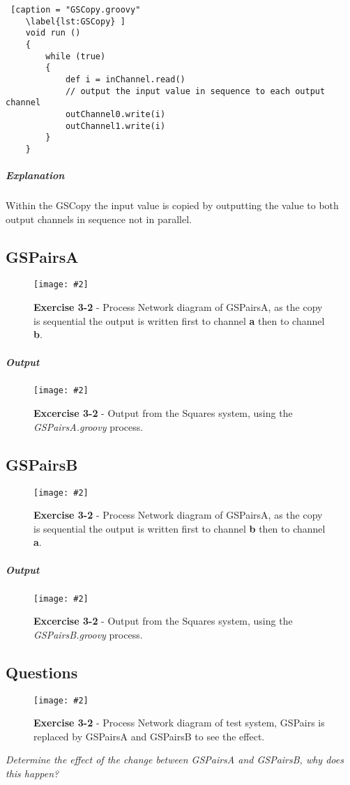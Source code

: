 \documentclass[10pt, a4paper]{article}
\newcommand{\figuremacro}[5]{
    \begin{figure}[#1]
        \centering
        \texttt{[image: \#2]}
        \caption[#3]{\textbf{#3}#4}
        \label{fig:#2}
    \end{figure}
}
\begin{document}
	\begin{lstlisting} [caption = "GSCopy.groovy"
	\label{lst:GSCopy} ]
	void run ()
	{
		while (true)
		{
			def i = inChannel.read()
			// output the input value in sequence to each output channel
			outChannel0.write(i)
			outChannel1.write(i)
		}
	} \end{lstlisting}
	
	\subparagraph{Explanation}
	
	Within the GSCopy the input value is copied by outputting the value to both output channels in sequence not in parallel.
	
	\subsection*{GSPairsA}

	\figuremacro{H}{GPairsAPN}{Exercise 3-2}{ - Process Network diagram of GSPairsA, as the copy is sequential the output is written first to channel \textbf{a} then to channel \textbf{b}.}{1.0}

	\subparagraph{Output} \hfill
	
	\figuremacro{H}{pairsAoutput}{Excercise 3-2}{ -  Output from the Squares system, using the \textit{GSPairsA.groovy} process.}{0.4}
	
	\subsection*{GSPairsB}
	
	\figuremacro{H}{GPairsBPN}{Exercise 3-2}{ - Process Network diagram of GSPairsA, as the copy is sequential the output is written first to channel \textbf{b} then to channel \textbf{a}.}{1.0}

	\subparagraph{Output} \hfill
		
	\figuremacro{H}{pairsBoutput}{Excercise 3-2}{ -  Output from the Squares system, using the \textit{GSPairsB.groovy} process.}{0.2}
	
	\subsection*{Questions}
	
	\figuremacro{H}{GSquaresPN}{Exercise 3-2}{ - Process Network diagram of test system, GSPairs is replaced by GSPairsA and GSPairsB to see the effect.}{1.0}
	
	\textit{Determine the effect of the change between GSPairsA and GSPairsB, why does this happen?} %
	
\end{document}
